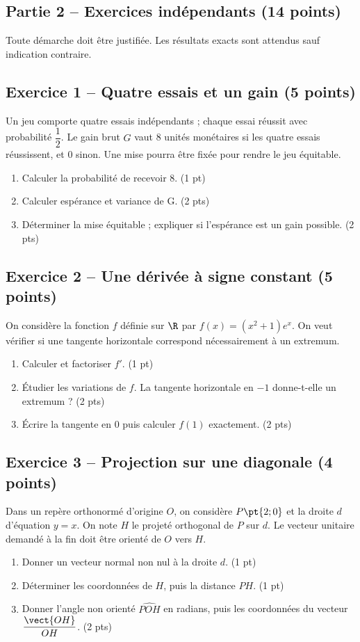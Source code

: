 \mxnewpage\subsection*{Partie 2 -- Exercices indépendants (14 points)}
Toute démarche doit être justifiée. Les résultats exacts sont attendus sauf indication contraire.
\subsection*{Exercice 1 -- Quatre essais et un gain (5 points)}
Un jeu comporte quatre essais indépendants ; chaque essai réussit avec probabilité $\dfrac12$. Le gain brut $G$ vaut 8 unités monétaires si les quatre essais réussissent, et 0 sinon. Une mise pourra être fixée pour rendre le jeu équitable.
\begin{enumerate}
\item Calculer la probabilité de recevoir 8. \hfill(1 pt)
\item Calculer espérance et variance de G. \hfill(2 pts)
\item Déterminer la mise équitable ; expliquer si l’espérance est un gain possible. \hfill(2 pts)
\end{enumerate}
\subsection*{Exercice 2 -- Une dérivée à signe constant (5 points)}
On considère la fonction $f$ définie sur $\R$ par $f(x)=(x^2+1)e^x$. On veut vérifier si une tangente horizontale correspond nécessairement à un extremum.
\begin{enumerate}
\item Calculer et factoriser $f\prime$. \hfill(1 pt)
\item Étudier les variations de $f$. La tangente horizontale en $-1$ donne-t-elle un extremum ? \hfill(2 pts)
\item Écrire la tangente en 0 puis calculer $f(1)$ exactement. \hfill(2 pts)
\end{enumerate}
\subsection*{Exercice 3 -- Projection sur une diagonale (4 points)}
Dans un repère orthonormé d’origine $O$, on considère $P\pt{2;0}$ et la droite $d$ d’équation $y=x$. On note $H$ le projeté orthogonal de $P$ sur $d$. Le vecteur unitaire demandé à la fin doit être orienté de $O$ vers $H$.
\begin{enumerate}
\item Donner un vecteur normal non nul à la droite $d$. \hfill(1 pt)
\item Déterminer les coordonnées de $H$, puis la distance $PH$. \hfill(1 pt)
\item Donner l’angle non orienté $\widehat{POH}$ en radians, puis les coordonnées du vecteur $\dfrac{\vect{OH}}{OH}$. \hfill(2 pts)
\end{enumerate}
